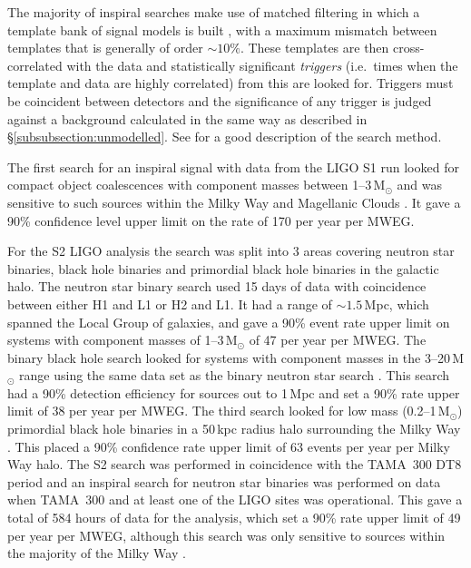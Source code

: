 \documentclass{article}
\begin{document}
The majority of inspiral searches make use of matched filtering in which a
template bank of signal models is built \cite{Owen:1996, Owen:1999}, with a
maximum mismatch between templates that is generally of order $\sim10\%$. These
templates are then cross-correlated with the data and statistically significant
{\it triggers} (i.e.\ times when the template and data are highly correlated)
from this are looked for. Triggers must be coincident between detectors and the
significance of any trigger is judged against a background calculated in the
same way as described in \S\ref{subsubsection:unmodelled}. See
\cite{Abbott:2005b} for a good description of the search method.

The first search for an inspiral signal with data from the LIGO S1 run looked
for compact object coalescences with component masses between 1--3\,M$_{\odot}$
and was sensitive to such sources within the Milky Way and Magellanic Clouds
\cite{Abbott:2004c}. It gave a 90\% confidence level upper limit on the rate of
170 per year per MWEG.

For the S2 LIGO analysis the search was split into 3 areas covering neutron star
binaries, black hole binaries and primordial black hole binaries in the galactic
halo. The neutron star binary search \cite{Abbott:2005b} used 15 days of data
with coincidence between either H1 and L1 or H2 and L1. It had a range of
$\sim1.5$\,Mpc, which spanned the Local Group of galaxies, and gave a 90\% event
rate upper limit on systems with component masses of 1--3\,M$_{\odot}$ of 47 per
year per MWEG. The binary black hole search looked for systems with component
masses in the 3--20\,M$_{\odot}$ range using the same data set as the binary
neutron star search \cite{Abbott:2006a}. This search had a 90\% detection
efficiency for sources out to 1\,Mpc and set a 90\% rate upper limit of 38 per
year per MWEG. The third search looked for low mass (0.2--1\,M$_{\odot}$)
primordial black hole binaries in a 50\,kpc radius halo surrounding the Milky
Way \cite{Abbott:2005e}. This placed a 90\% confidence rate upper limit of 63
events per year per Milky Way halo. The S2 search was performed in coincidence
with the TAMA~300 DT8 period and an inspiral search for neutron star binaries was
performed on data when TAMA~300 and at least one of the LIGO sites was
operational. This gave a total of 584 hours of data for the analysis, which set
a 90\% rate upper limit of 49 per year per MWEG, although this search was only
sensitive to sources within the majority of the Milky Way \cite{Abbott:2006b}.
\end{document}
